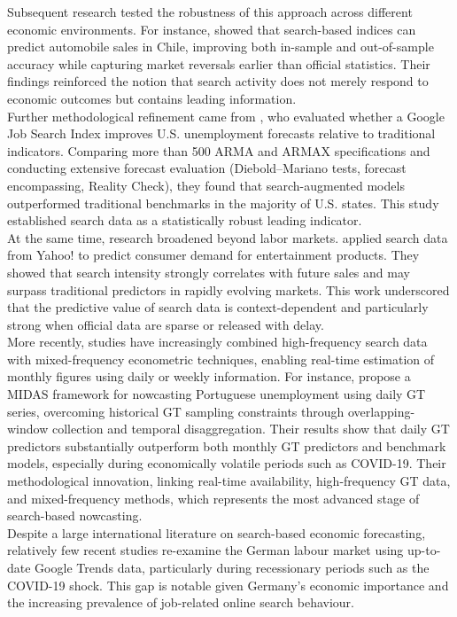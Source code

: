 \documentclass[12pt,a4paper]{article}
\begin{document}
Subsequent research tested the robustness of this approach across different economic environments. For instance, \citet{carrier} showed that search-based indices can predict automobile sales in Chile, improving both in-sample and out-of-sample accuracy while capturing market reversals earlier than official statistics. Their findings reinforced the notion that search activity does not merely respond to economic outcomes but contains leading information.
\\
Further methodological refinement came from \citet{D'Amuri2010Google}, who evaluated whether a Google Job Search Index improves U.S. unemployment forecasts relative to traditional indicators. Comparing more than 500 ARMA and ARMAX specifications and conducting extensive forecast evaluation (Diebold–Mariano tests, forecast encompassing, Reality Check), they found that search-augmented models outperformed traditional benchmarks in the majority of U.S. states. This study established search data as a statistically robust leading indicator.
\\
At the same time, research broadened beyond labor markets. \citet{goel} applied search data from Yahoo! to predict consumer demand for entertainment products. They showed that search intensity strongly correlates with future sales and may surpass traditional predictors in rapidly evolving markets. This work underscored that the predictive value of search data is context-dependent and particularly strong when official data are sparse or released with delay.\\
More recently, studies have increasingly combined high-frequency search data with mixed-frequency econometric techniques, enabling real-time estimation of monthly figures using daily or weekly information. For instance, \citet{COSTA2024101963} propose a MIDAS framework for nowcasting Portuguese unemployment using daily GT series, overcoming historical GT sampling constraints through overlapping-window collection and temporal disaggregation. Their results show that daily GT predictors substantially outperform both monthly GT predictors and benchmark models, especially during economically volatile periods such as COVID-19. Their methodological innovation, linking real-time availability, high-frequency GT data, and mixed-frequency methods, which represents the most advanced stage of search-based nowcasting.\\
Despite a large international literature on search-based economic forecasting, relatively few recent studies re-examine the German labour market using up-to-date Google Trends data, particularly during recessionary periods such as the COVID-19 shock. This gap is notable given Germany’s economic importance and the increasing prevalence of job-related online search behaviour.\\
\end{document}
